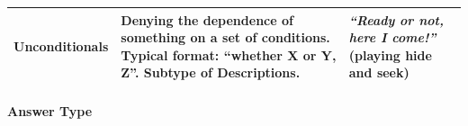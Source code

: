 \documentclass[oneside]{report}
\theoremstyle{definition}
\theoremstyle{definition}
\theoremstyle{definition}
\theoremstyle{remark}
\begin{document}
\begin{longtable}[]{@{}lll@{}}
\begin{minipage}[t]{0.14\columnwidth}
Unconditionals\strut
\end{minipage} & \begin{minipage}[t]{0.44\columnwidth}\raggedright\strut
Denying the dependence of something on a set of conditions. Typical
format: ``whether X or Y, Z''. Subtype of Descriptions.\strut
\end{minipage} & \begin{minipage}[t]{0.33\columnwidth}\raggedright\strut
\emph{``Ready or not, here I come!''} (playing hide and seek)\strut
\end{minipage}\tabularnewline
\bottomrule
\end{longtable}
\paragraph{Answer Type}\label{answer-type}
\end{document}
